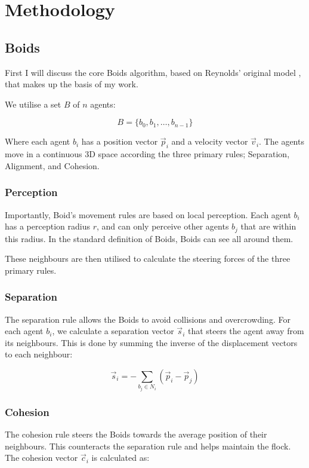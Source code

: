 \chapter{Methodology}
\label{chap:methodology}

\section{Boids}
\label{sec:boids}

First I will discuss the core Boids algorithm, based on Reynolds' original model \cite{reynolds1987flocks}, that makes up the basis of my work.

We utilise a set $B$ of $n$ agents:

$$B = \{b_0, b_1, \ldots, b_{n-1}\}$$

Where each agent $b_i$ has a position vector $\vec{p}_i$ and a velocity vector $\vec{v}_i$. The agents move in a continuous 3D space according the three primary rules; Separation, Alignment, and Cohesion.

\subsection{Perception}
Importantly, Boid's movement rules are based on local perception. Each agent $b_i$ has a perception radius $r$, and can only perceive other agents $b_j$ that are within this radius. In the standard definition of Boids\cite{reynolds1987flocks}, Boids can see all around them.

These neighbours are then utilised to calculate the steering forces of the three primary rules.

\subsection{Separation}

The separation rule allows the Boids to avoid collisions and overcrowding. For each agent $b_i$, we calculate a separation vector $\vec{s}_i$ that steers the agent away from its neighbours. This is done by summing the inverse of the displacement vectors to each neighbour:

$$\vec{s}_i = -\sum_{b_j \in N_i} (\vec{p}_i - \vec{p}_j)$$

\subsection{Cohesion}

The cohesion rule steers the Boids towards the average position of their neighbours. This counteracts the separation rule and helps maintain the flock. The cohesion vector $\vec{c}_i$ is calculated as:

